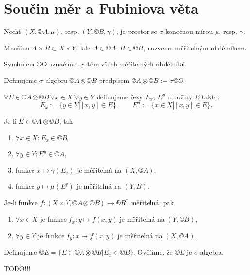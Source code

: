 \documentclass[12pt]{article}					%
\begin{document}
\section{Součin měr a Fubiniova věta}
\begin{poznamka}
	Nechť $(X, ©A, \mu)$, resp. $(Y, ©B, \gamma)$, je prostor se $\sigma$ konečnou mírou $\mu$, resp. $\gamma$.
\end{poznamka}

\begin{definice}
	Množinu $A \times B \subset X \times Y$, kde $A \in ©A$, $B \in ©B$, nazveme měřitelným obdélníkem.

	Symbolem ©O označíme systém všech měřitelných obdélníků.
\end{definice}

\begin{definice}
	Definujeme $\sigma$-algebru $©A \otimes ©B$ předpisem $©A \otimes ©B := \sigma ©O$.

	$\forall E \in ©A \otimes ©B\ \forall x \in X\ \forall y \in Y$ definujeme řezy $E_x$, $E^y$ množiny $E$ takto:
	$$ E_x := \{y \in Y | [x, y] \in E\}, \qquad E^y := \{x \in X | [x, y] \in E\}. $$
\end{definice}

\begin{veta}
	Je-li $E \in ©A \otimes ©B$, tak

	\begin{enumerate}
		\item $\forall x \in X: E_x \in ©B$,
		\item $\forall y \in Y: E^y \in ©A$,
		\item funkce $x \mapsto \gamma(E_x)$ je měřitelná na $(X, ®A)$,
		\item funkce $y \mapsto \mu(E^y)$ je měřitelná na $(Y, B)$.
	\end{enumerate}

	Je-li funkce $f: (X\times Y, ©A \otimes ©B) \rightarrow ®R^*$ měřitelná, pak

	\begin{enumerate}
		\item $\forall x \in X$ je funkce $f_x: y \mapsto f(x, y)$ je měřitelná na $(Y, ©B)$,
		\item $\forall y \in Y$ je funkce $f_y: x \mapsto f(x, y)$ je měřitelná na $(X, ©A)$.
	\end{enumerate}

	\begin{dukazin}
		Definujeme $©E = \{E \in ©A \otimes ©B | E_x \in ©B\}$. Ověříme, že $©E$ je $\sigma$-algebra.

		TODO!!!
	\end{dukazin}
\end{veta}
\end{document}
